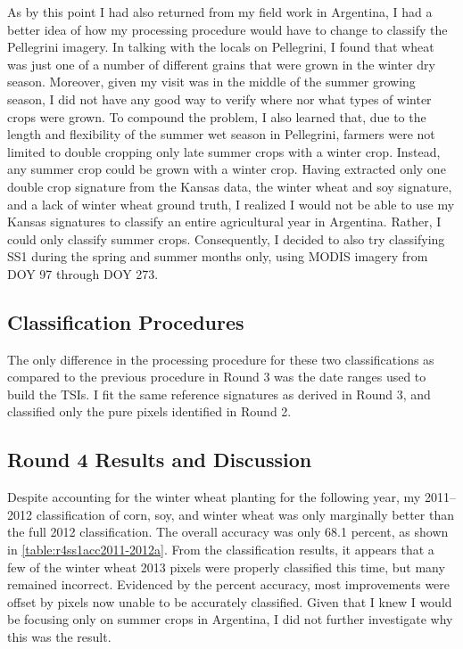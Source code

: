 As by this point I had also returned from my field work in Argentina, I had a better idea of how my processing procedure would have to change to classify the Pellegrini imagery. In talking with the locals on Pellegrini, I found that wheat was just one of a number of different grains that were grown in the winter dry season. Moreover, given my visit was in the middle of the summer growing season, I did not have any good way to verify where nor what types of winter crops were grown. To compound the problem, I also learned that, due to the length and flexibility of the summer wet season in Pellegrini, farmers were not limited to double cropping only late summer crops with a winter crop. Instead, any summer crop could be grown with a winter crop. Having extracted only one double crop signature from the Kansas data, the winter wheat and soy signature, and a lack of winter wheat ground truth, I realized I would not be able to use my Kansas signatures to classify an entire agricultural year in Argentina. Rather, I could only classify summer crops. Consequently, I decided to also try classifying SS1 during the spring and summer months only, using MODIS imagery from DOY 97 through DOY 273.

\subsection*{Classification Procedures}

The only difference in the processing procedure for these two classifications as compared to the previous procedure in Round 3 was the date ranges used to build the TSIs. I fit the same reference signatures as derived in Round 3, and classified only the pure pixels identified in Round 2.

\subsection*{Round 4 Results and Discussion}

Despite accounting for the winter wheat planting for the following year, my 2011--2012 classification of corn, soy, and winter wheat was only marginally better than the full 2012 classification. The overall accuracy was only 68.1 percent, as shown in \cref{table:r4ss1acc2011-2012a}. From the classification results, it appears that a few of the winter wheat 2013 pixels were properly classified this time, but many remained incorrect. Evidenced by the percent accuracy, most improvements were offset by pixels now unable to be accurately classified. Given that I knew I would be focusing only on summer crops in Argentina, I did not further investigate why this was the result.

